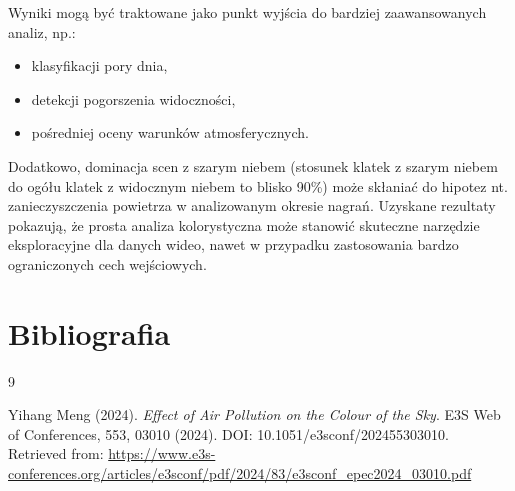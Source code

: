 \documentclass[12pt]{article}
\begin{document}
Wyniki mogą być traktowane jako punkt wyjścia do bardziej zaawansowanych analiz,  np.:
\begin{itemize}
    \item klasyfikacji pory dnia,
    \item detekcji pogorszenia widoczności,
    \item pośredniej oceny warunków atmosferycznych.
\end{itemize}

Dodatkowo, dominacja scen z szarym niebem (stosunek klatek z szarym niebem do ogółu klatek z widocznym niebem to blisko 90\%) może skłaniać do hipotez nt. zanieczyszczenia powietrza  w analizowanym okresie nagrań. Uzyskane rezultaty pokazują, że prosta analiza kolorystyczna może stanowić skuteczne narzędzie eksploracyjne dla danych wideo, nawet w przypadku zastosowania bardzo ograniczonych cech wejściowych.

\section{Bibliografia}

\begin{thebibliography}{9}

    Yihang Meng (2024).
    \textit{Effect of Air Pollution on the Colour of the Sky}.
    E3S Web of Conferences, 553, 03010 (2024).
    DOI: 10.1051/e3sconf/202455303010.
    Retrieved from: \url{https://www.e3s-conferences.org/articles/e3sconf/pdf/2024/83/e3sconf_epec2024_03010.pdf}

\end{thebibliography}
\end{document}
